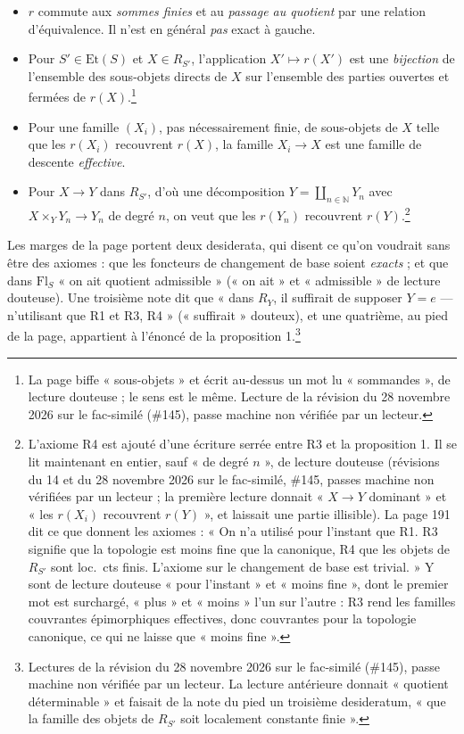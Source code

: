 \documentclass[11pt,a4paper]{article}
\begin{document}
\begin{itemize}
\item[\textbf{R1}] $r$ commute aux \emph{sommes finies} et au \emph{passage au
  quotient} par une relation d'équivalence. Il n'est en général \emph{pas}
  exact à gauche.

\item[\textbf{R2}] Pour $S' \in \mathrm{Et}(S)$ et $X \in R_{S'}$,
  l'application $X' \mapsto r(X')$ est une \emph{bijection} de l'ensemble des
  sous-objets directs de $X$ sur l'ensemble des parties ouvertes et fermées de
  $r(X)$.\footnote{La page biffe « sous-objets » et écrit au-dessus un mot lu
  « sommandes », de lecture douteuse ; le sens est le même. Lecture de la révision du 28 novembre 2026 sur le fac-similé (\#145), passe machine non vérifiée par un lecteur.}

\item[\textbf{R3}] Pour une famille $(X_{i})$, pas nécessairement finie,
  de sous-objets de $X$ telle que les $r(X_{i})$ recouvrent $r(X)$, la famille
  $X_{i} \to X$ est une famille de descente \emph{effective}.

\item[\textbf{R4}] Pour $X \to Y$ dans $R_{S'}$, d'où une décomposition
  $Y = \coprod_{n \in \mathbb{N}} Y_{n}$ avec $X \times_{Y} Y_{n} \to Y_{n}$
  de degré $n$, on veut que les $r(Y_{n})$ recouvrent
  $r(Y)$.\footnote{L'axiome R4 est ajouté d'une écriture serrée entre R3 et
  la proposition 1. Il se lit maintenant en entier, sauf « de degré $n$ », de
  lecture douteuse (révisions du 14 et du 28 novembre 2026 sur le fac-similé,
  \#145, passes machine non vérifiées par un lecteur ; la première lecture
  donnait « $X \to Y$ dominant » et « les $r(X_{i})$ recouvrent $r(Y)$ », et
  laissait une partie illisible). La page 191 dit ce que donnent les
  axiomes : « On n'a utilisé pour l'instant que R1. R3 signifie que la
  topologie est moins fine que la canonique, R4 que les objets de $R_{S'}$
  sont loc.\ cts finis. L'axiome sur le changement de base est trivial. » Y
  sont de lecture douteuse « pour l'instant » et « moins fine », dont le
  premier mot est surchargé, « plus » et « moins » l'un sur l'autre : R3 rend
  les familles couvrantes épimorphiques effectives, donc couvrantes pour la
  topologie canonique, ce qui ne laisse que « moins fine ».}
\end{itemize}

Les marges de la page portent deux desiderata, qui disent ce qu'on voudrait
sans être des axiomes : que les foncteurs de changement de base soient
\emph{exacts} ; et que dans $\mathrm{Fl}_{S}$ « on ait quotient admissible »
(« on ait » et « admissible » de lecture douteuse). Une troisième note dit
que « dans $R_{Y}$, il suffirait de supposer $Y = e$ --- n'utilisant que R1
et R3, R4 » (« suffirait » douteux), et une quatrième, au pied de la page,
appartient à l'énoncé de la proposition 1.\footnote{Lectures de la révision
du 28 novembre 2026 sur le fac-similé (\#145), passe machine non vérifiée
par un lecteur. La lecture antérieure donnait « quotient déterminable » et
faisait de la note du pied un troisième desideratum, « que la famille des
objets de $R_{S'}$ soit localement constante finie ».}
\end{document}
